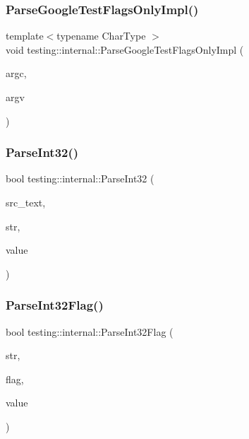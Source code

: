 \mbox{\label{namespacetesting_1_1internal_ae4c46ce8c3d016848fff52cc5133f2ac}} 
\subsubsection{\texorpdfstring{ParseGoogleTestFlagsOnlyImpl()}{ParseGoogleTestFlagsOnlyImpl()}}
{\footnotesize\ttfamily template$<$typename Char\+Type $>$ \\
void testing\+::internal\+::\+Parse\+Google\+Test\+Flags\+Only\+Impl (\begin{DoxyParamCaption}\item[{int $\ast$}]{argc,  }\item[{Char\+Type $\ast$$\ast$}]{argv }\end{DoxyParamCaption})}

\mbox{\label{namespacetesting_1_1internal_ac06fc81336a3d80755f4020d34321766}} 
\subsubsection{\texorpdfstring{ParseInt32()}{ParseInt32()}}
{\footnotesize\ttfamily bool testing\+::internal\+::\+Parse\+Int32 (\begin{DoxyParamCaption}\item[{const \mbox{\hyperlink{classtesting_1_1Message}{Message}} \&}]{src\+\_\+text,  }\item[{const char $\ast$}]{str,  }\item[{\mbox{\hyperlink{namespacetesting_1_1internal_a8ee38faaf875f133358abaf9bc056cec}{Int32}} $\ast$}]{value }\end{DoxyParamCaption})}

\mbox{\label{namespacetesting_1_1internal_ae3449e173767750b613114ceac6d916a}} 
\subsubsection{\texorpdfstring{ParseInt32Flag()}{ParseInt32Flag()}}
{\footnotesize\ttfamily bool testing\+::internal\+::\+Parse\+Int32\+Flag (\begin{DoxyParamCaption}\item[{const char $\ast$}]{str,  }\item[{const char $\ast$}]{flag,  }\item[{\mbox{\hyperlink{namespacetesting_1_1internal_a8ee38faaf875f133358abaf9bc056cec}{Int32}} $\ast$}]{value }\end{DoxyParamCaption})}

